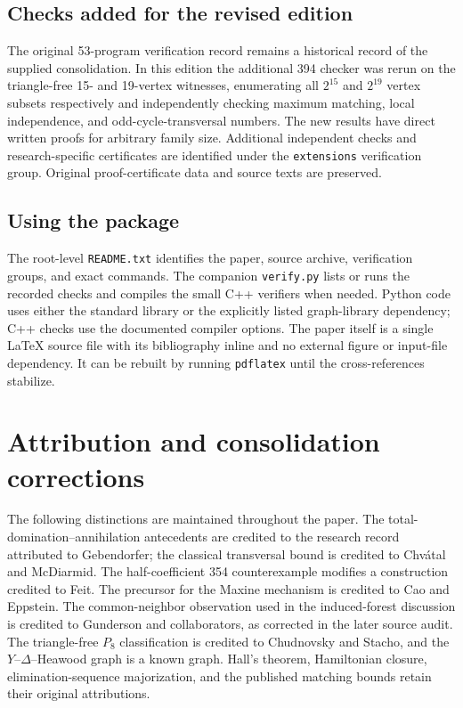 \documentclass[11pt,a4paper]{article}
\theoremstyle{definition}\newtheorem{definition}[theorem]{Definition}
\theoremstyle{remark}\newtheorem{remark}[theorem]{Remark}
\begin{document}
\subsection{Checks added for the revised edition}
The original 53-program verification record remains a historical record
of the supplied consolidation. In this edition the additional 394 checker
was rerun on the triangle-free 15- and 19-vertex witnesses, enumerating
all $2^{15}$ and $2^{19}$ vertex subsets respectively and independently
checking maximum matching, local independence, and odd-cycle-transversal
numbers. The new results have direct written proofs for arbitrary family
size. Additional independent checks and research-specific certificates are
identified under the \texttt{extensions} verification group. Original
proof-certificate data and source texts are preserved.

\subsection{Using the package}
The root-level \texttt{README.txt} identifies the paper, source archive,
verification groups, and exact commands. The companion
\texttt{verify.py} lists or runs the recorded checks and compiles the
small C++ verifiers when needed. Python code uses either the standard
library or the explicitly listed graph-library dependency; C++ checks
use the documented compiler options. The paper itself is a single
\LaTeX{} source file with its bibliography inline and no external
figure or input-file dependency. It can be rebuilt by running
\texttt{pdflatex} until the cross-references stabilize.

\section{Attribution and consolidation corrections}
\label{app:attribution}
The following distinctions are maintained throughout the paper.
The total-domination--annihilation antecedents are credited to the
research record attributed to Gebendorfer; the classical transversal
bound is credited to Chv\'atal and McDiarmid. The half-coefficient
354 counterexample modifies a construction credited to Feit. The
precursor for the Maxine mechanism is credited to Cao and Eppstein.
The common-neighbor observation used in the induced-forest discussion
is credited to Gunderson and collaborators, as corrected in the
later source audit. The triangle-free $P_8$ classification is credited
to Chudnovsky and Stacho, and the $Y$--$\Delta$--Heawood graph is a
known graph. Hall's theorem, Hamiltonian closure, elimination-sequence
majorization, and the published matching bounds retain their original
attributions.
\end{document}
